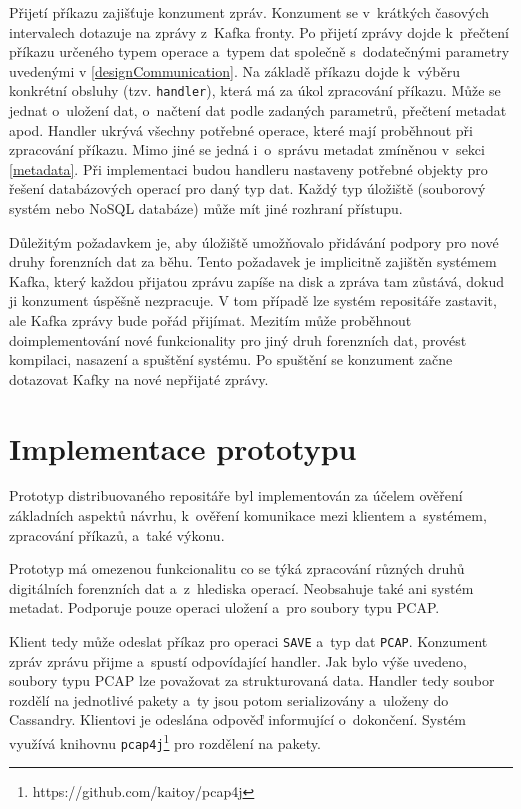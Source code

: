 Přijetí příkazu zajišťuje konzument zpráv. Konzument se v~krátkých časových intervalech dotazuje na zprávy z~Kafka fronty. Po přijetí zprávy dojde k~přečtení příkazu určeného typem operace a~typem dat společně s~dodatečnými parametry uvedenými v \ref{designCommunication}. Na základě příkazu dojde k~výběru konkrétní obsluhy (tzv. \texttt{handler}), která má za úkol zpracování příkazu. Může se jednat o~uložení dat, o~načtení dat podle zadaných parametrů, přečtení metadat apod. Handler ukrývá všechny potřebné operace, které mají proběhnout při zpracování příkazu. Mimo jiné se jedná i~o~správu metadat zmíněnou v~sekci \ref{metadata}. Při implementaci budou handleru nastaveny potřebné objekty pro řešení databázových operací pro daný typ dat. Každý typ úložiště (souborový systém nebo NoSQL databáze) může mít jiné rozhraní přístupu.

Důležitým požadavkem je, aby úložiště umožňovalo přidávání podpory pro nové druhy forenzních dat za běhu. Tento požadavek je implicitně zajištěn systémem Kafka, který každou přijatou zprávu zapíše na disk a zpráva tam zůstává, dokud ji konzument úspěšně nezpracuje. V tom případě lze systém repositáře zastavit, ale Kafka zprávy bude pořád přijímat. Mezitím může proběhnout doimplementování nové funkcionality pro jiný druh forenzních dat, provést kompilaci, nasazení a spuštění systému. Po spuštění se konzument začne dotazovat Kafky na nové nepřijaté zprávy.


\chapter{Implementace prototypu} \label{chapterPrototype}
Prototyp distribuovaného repositáře byl implementován za účelem ověření základních aspektů návrhu, k~ověření komunikace mezi klientem a~systémem, zpracování příkazů, a~také výkonu.

Prototyp má omezenou funkcionalitu co se týká zpracování různých druhů digitálních forenzních dat a~z~hlediska operací. Neobsahuje také ani systém metadat. Podporuje pouze operaci uložení a~pro soubory typu PCAP.

Klient tedy může odeslat příkaz pro operaci \texttt{SAVE} a~typ dat \texttt{PCAP}. Konzument zpráv zprávu přijme a~spustí odpovídající handler. Jak bylo výše uvedeno, soubory typu PCAP lze považovat za strukturovaná data. Handler tedy soubor rozdělí na jednotlivé pakety a~ty jsou potom serializovány a~uloženy do Cassandry. Klientovi je odeslána odpověď informující o~dokončení. Systém využívá knihovnu \texttt{pcap4j}\footnote{https://github.com/kaitoy/pcap4j} pro rozdělení na pakety.

